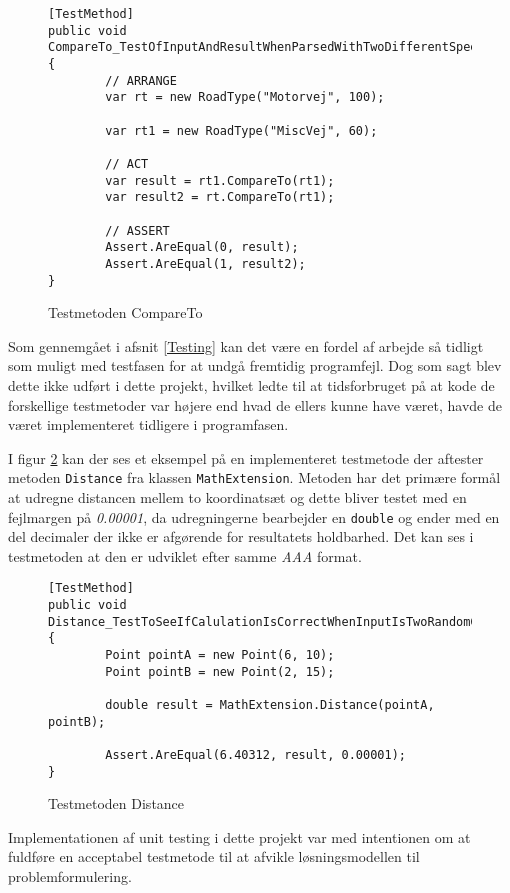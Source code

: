 \begin{figure}[H]
\begin{lstlisting}
[TestMethod]
public void 
CompareTo_TestOfInputAndResultWhenParsedWithTwoDifferentSpeedValues()
{
		// ARRANGE
		var rt = new RoadType("Motorvej", 100);
           
		var rt1 = new RoadType("MiscVej", 60);

		// ACT
		var result = rt1.CompareTo(rt1);
		var result2 = rt.CompareTo(rt1);

		// ASSERT    
		Assert.AreEqual(0, result);
		Assert.AreEqual(1, result2);
}
\end{lstlisting}
\caption{Testmetoden CompareTo}\label{comparetotestmetode}
\end{figure}

Som gennemgået i afsnit \ref{Testing} kan det være en fordel af arbejde så tidligt som muligt med testfasen for at undgå fremtidig programfejl. Dog som sagt blev dette ikke udført i dette projekt, hvilket ledte til at tidsforbruget på at kode de forskellige testmetoder var højere end hvad de ellers kunne have været, havde de været implementeret tidligere i programfasen.

I figur \ref{DistanceTestMethod} kan der ses et eksempel på en implementeret testmetode der aftester metoden \texttt{Distance} fra klassen \texttt{MathExtension}. Metoden har det primære formål at udregne distancen mellem to koordinatsæt og dette bliver testet med en fejlmargen på \textit{0.00001}, da udregningerne bearbejder en \texttt{double} og ender med en del decimaler der ikke er afgørende for resultatets holdbarhed. Det kan ses i testmetoden at den er udviklet efter samme \textit{AAA} format.

\begin{figure}[H]
\begin{lstlisting}
[TestMethod]
public void 
Distance_TestToSeeIfCalulationIsCorrectWhenInputIsTwoRandomCoords()
{
		Point pointA = new Point(6, 10);
		Point pointB = new Point(2, 15);

        double result = MathExtension.Distance(pointA, pointB);

        Assert.AreEqual(6.40312, result, 0.00001);
}
\end{lstlisting}
\caption{Testmetoden Distance}\label{DistanceTestMethod}
\end{figure}

Implementationen af unit testing i dette projekt var med intentionen om at fuldføre en acceptabel testmetode til at afvikle løsningsmodellen til problemformulering.
